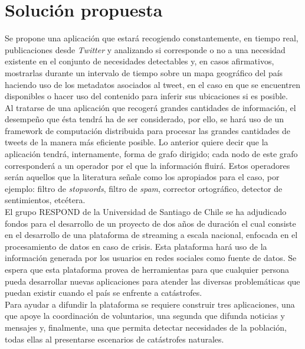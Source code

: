 \section{Solución propuesta}
\label{intro:solucion}

Se propone una aplicación que estará recogiendo constantemente, en tiempo real, publicaciones desde \textit{Twitter} y analizando si corresponde o no a una necesidad existente en el conjunto de necesidades detectables y, en casos afirmativos, mostrarlas durante un intervalo de tiempo sobre un mapa geográfico del país haciendo uso de los metadatos asociados al tweet, en el caso en que se encuentren disponibles o hacer uso del contenido para inferir sus ubicaciones si es posible.\\

Al tratarse de una aplicación que recogerá grandes cantidades de información, el desempeño que ésta tendrá ha de ser considerado, por ello, se hará uso de un framework de computación distribuida para procesar las grandes cantidades de tweets de la manera más eficiente posible. Lo anterior quiere decir que la aplicación tendrá, internamente, forma de grafo dirigido; cada nodo de este grafo corresponderá a un operador por el que la información fluirá. Estos operadores serán aquellos que la literatura señale como los apropiados para el caso, por ejemplo: filtro de \textit{stopwords}, filtro de \textit{spam}, corrector ortográfico, detector de sentimientos, etcétera.\\

El grupo RESPOND de la Universidad de Santiago de Chile se ha adjudicado fondos para el desarrollo de un proyecto de dos años de duración el cual consiste en el desarrollo de una plataforma de streaming a escala nacional, enfocada en el procesamiento de datos en caso de crisis. Esta plataforma hará uso de la información generada por los usuarios en redes sociales como fuente de datos. Se espera que esta plataforma provea de herramientas para que cualquier persona pueda desarrollar nuevas aplicaciones para atender las diversas problemáticas que puedan existir cuando el país se enfrente a catástrofes.\\

Para ayudar a difundir la plataforma se requiere construir tres aplicaciones, una que apoye la coordinación de voluntarios, una segunda que difunda noticias y mensajes y, finalmente, una que permita detectar necesidades de la población, todas ellas al presentarse escenarios de catástrofes naturales.\\

